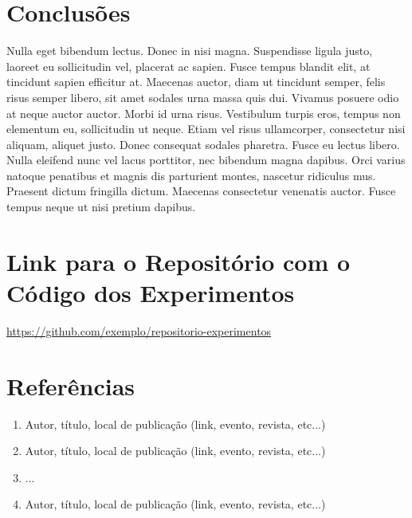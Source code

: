 \documentclass[12pt,a4paper]{article}
\begin{document}
\section{Conclusões}
Nulla eget bibendum lectus. Donec in nisi magna. Suspendisse ligula justo, laoreet eu sollicitudin vel, placerat ac sapien. Fusce tempus blandit elit, at tincidunt sapien efficitur at. Maecenas auctor, diam ut tincidunt semper, felis risus semper libero, sit amet sodales urna massa quis dui. Vivamus posuere odio at neque auctor auctor. Morbi id urna risus. Vestibulum turpis eros, tempus non elementum eu, sollicitudin ut neque. Etiam vel risus ullamcorper, consectetur nisi aliquam, aliquet justo. Donec consequat sodales pharetra. Fusce eu lectus libero. Nulla eleifend nunc vel lacus porttitor, nec bibendum magna dapibus. Orci varius natoque penatibus et magnis dis parturient montes, nascetur ridiculus mus. Praesent dictum fringilla dictum. Maecenas consectetur venenatis auctor. Fusce tempus neque ut nisi pretium dapibus.

\section{Link para o Repositório com o Código dos Experimentos}
\url{https://github.com/exemplo/repositorio-experimentos}


\section*{Referências}
\begin{enumerate}
    \item Autor, título, local de publicação (link, evento, revista, etc...)
    \item Autor, título, local de publicação (link, evento, revista, etc...)
    \item ...
    \item Autor, título, local de publicação (link, evento, revista, etc...)
\end{enumerate}
\end{document}
